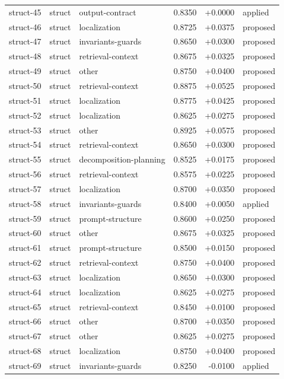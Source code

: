\begin{center}
\begin{longtable}{llp{5.2cm}rrl}
struct-45 & struct & output-contract & 0.8350 & +0.0000 & applied \\
struct-46 & struct & localization & 0.8725 & +0.0375 & proposed \\
struct-47 & struct & invariants-guards & 0.8650 & +0.0300 & proposed \\
struct-48 & struct & retrieval-context & 0.8675 & +0.0325 & proposed \\
struct-49 & struct & other & 0.8750 & +0.0400 & proposed \\
struct-50 & struct & retrieval-context & 0.8875 & +0.0525 & proposed \\
struct-51 & struct & localization & 0.8775 & +0.0425 & proposed \\
struct-52 & struct & localization & 0.8625 & +0.0275 & proposed \\
struct-53 & struct & other & 0.8925 & +0.0575 & proposed \\
struct-54 & struct & retrieval-context & 0.8650 & +0.0300 & proposed \\
struct-55 & struct & decomposition-planning & 0.8525 & +0.0175 & proposed \\
struct-56 & struct & retrieval-context & 0.8575 & +0.0225 & proposed \\
struct-57 & struct & localization & 0.8700 & +0.0350 & proposed \\
struct-58 & struct & invariants-guards & 0.8400 & +0.0050 & applied \\
struct-59 & struct & prompt-structure & 0.8600 & +0.0250 & proposed \\
struct-60 & struct & other & 0.8675 & +0.0325 & proposed \\
struct-61 & struct & prompt-structure & 0.8500 & +0.0150 & proposed \\
struct-62 & struct & retrieval-context & 0.8750 & +0.0400 & proposed \\
struct-63 & struct & localization & 0.8650 & +0.0300 & proposed \\
struct-64 & struct & localization & 0.8625 & +0.0275 & proposed \\
struct-65 & struct & retrieval-context & 0.8450 & +0.0100 & proposed \\
struct-66 & struct & other & 0.8700 & +0.0350 & proposed \\
struct-67 & struct & other & 0.8625 & +0.0275 & proposed \\
struct-68 & struct & localization & 0.8750 & +0.0400 & proposed \\
struct-69 & struct & invariants-guards & 0.8250 & -0.0100 & applied \\

\end{longtable}
\end{center}
